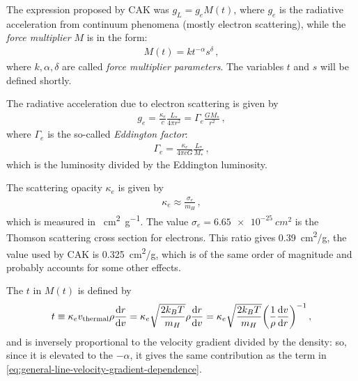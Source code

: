 \documentclass[main.tex]{subfiles}
\begin{document}
The expression proposed by CAK was \(g_L = g_e M(t)\), where \(g_e\) is the radiative acceleration from continuum phenomena (mostly electron scattering), while the \emph{force multiplier} \(M\) is in the form: 
%
\begin{align}
  M(t)  = k t^{-\alpha } s^{ \delta }
\,,
\end{align}
%
where \(k , \alpha , \delta \) are called \emph{force multiplier parameters}. The variables \(t\) and \(s\) will be defined shortly.

The radiative acceleration due to electron scattering is given by 
%
\begin{align}
  g_e = \frac{\kappa _e}{c} \frac{L_{*}}{4 \pi r^2} = \Gamma _e \frac{GM_{*}}{r^2}
\,,
\end{align}
%
where \(\Gamma _e \) is the so-called \emph{Eddington factor}: 
%
\begin{align}
  \Gamma _e = \frac{\kappa _e}{4 \pi c G} \frac{L_{*}}{M_{*}}
\,,
\end{align}
%
which is the luminosity divided by the Eddington luminosity.

The scattering opacity \(\kappa _e\) is given by 
%
\begin{align}
  \kappa _e \approx \frac{\sigma_{e}}{m_H }
\,,
\end{align}
%
which is measured in \SI{}{cm^2g^{-1}}. The value \(\sigma _e = \SI{6.65e-25}{cm^2}\) is the Thomson scattering cross section for electrons. This ratio gives \SI{0.39}{cm^2/g}, the value used by CAK is \SI{.325}{cm^2/g}, which is of the same order of magnitude and probably accounts for some other effects.

The \(t\) in \(M(t)\) is defined by 
%
\begin{align}
  t \equiv \kappa _e v _{\text{thermal}} \rho \dv{r}{v}
  = \kappa_e \sqrt{\frac{2 k_B T}{m_H}} \rho \dv{r}{v}
  = \kappa_{e} \sqrt{\frac{2 k_B T}{m_H}} \qty(\frac{1}{\rho } \dv{v}{r})^{-1}
\,,
\end{align}
%
and is inversely proportional to the velocity gradient divided by the density: so, since it is elevated to the \(- \alpha \), it gives the same contribution as the term in \eqref{eq:general-line-velocity-gradient-dependence}.
\end{document}

